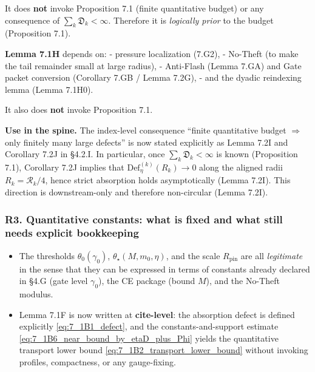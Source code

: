 \documentclass[
  11pt,
]{article}
\providecommand{\tightlist}{%
  \setlength{\itemsep}{0pt}\setlength{\parskip}{0pt}}
\begin{document}
It does \textbf{not} invoke Proposition 7.1 (finite quantitative budget) or any consequence of \(\sum_k\mathfrak D_k<\infty\). Therefore it is \emph{logically prior} to the budget (Proposition 7.1).

\textbf{Lemma 7.1H} depends on: - pressure localization (7.G2), - No-Theft (to make the tail remainder small at large radius), - Anti-Flash (Lemma 7.GA) and Gate packet conversion (Corollary 7.GB / Lemma 7.2G), - and the dyadic reindexing lemma (Lemma 7.1H0).

It also does \textbf{not} invoke Proposition 7.1.

\textbf{Use in the spine.} The index-level consequence ``finite quantitative budget \(\Rightarrow\) only finitely many large defects'' is now stated explicitly as Lemma 7.2I and Corollary 7.2J in §4.2.I. In particular, once \(\sum_k\mathfrak D_k<\infty\) is known (Proposition 7.1), Corollary 7.2J implies that \(\mathrm{Def}^{(k)}_{\eta}(R_k)\to0\) along the aligned radii \(R_k=\mathcal R_k/4\), hence strict absorption holds asymptotically (Lemma 7.2I). This direction is downstream-only and therefore non-circular (Lemma 7.2I).

\hypertarget{r3.-quantitative-constants-what-is-fixed-and-what-still-needs-explicit-bookkeeping}{%
\subsubsection{R3. Quantitative constants: what is fixed and what still needs explicit bookkeeping}\label{r3.-quantitative-constants-what-is-fixed-and-what-still-needs-explicit-bookkeeping}}

\begin{itemize}
\tightlist
\item
  The thresholds \(\theta_0(\gamma_0)\), \(\theta_\star(M,m_0,\eta)\), and the scale \(R_{\mathrm{pin}}\) are all \emph{legitimate} in the sense that they can be expressed in terms of constants already declared in §4.G (gate level \(\gamma_0\)), the CE package (bound \(M\)), and the No-Theft modulus.
\item
  Lemma 7.1F is now written at \textbf{cite-level}: the absorption defect is defined explicitly \eqref{eq:7_1B1_defect}, and the constants-and-support estimate \eqref{eq:7_1B6_near_bound_by_etaD_plus_Phi} yields the quantitative transport lower bound \eqref{eq:7_1B2_transport_lower_bound} without invoking profiles, compactness, or any gauge-fixing.
\end{itemize}
\end{document}
